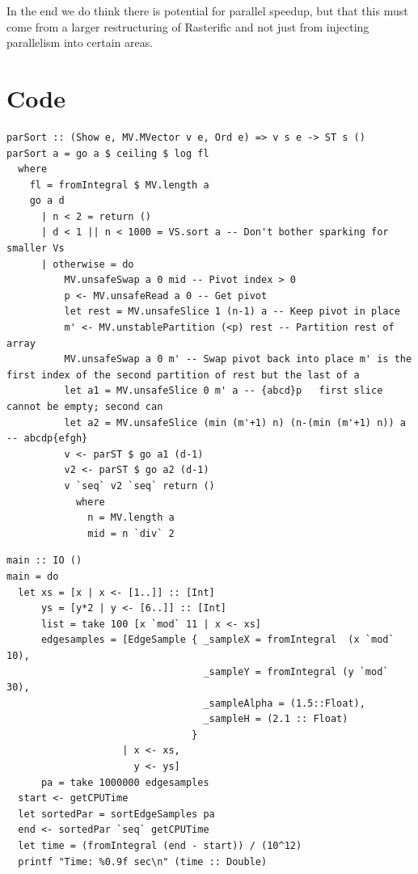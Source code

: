 \documentclass[12pt, a4paper]{article}
\begin{document}
In the end we do think there is potential for parallel speedup, but that this must come from a larger restructuring of Rasterific and not just from injecting parallelism
 into certain areas.

\clearpage
\appendix

\section{Code}
\begin{lstlisting}[label={lst:parsort}, caption={Parallel Sorting}]
parSort :: (Show e, MV.MVector v e, Ord e) => v s e -> ST s ()
parSort a = go a $ ceiling $ log fl
  where
    fl = fromIntegral $ MV.length a
    go a d
      | n < 2 = return ()
      | d < 1 || n < 1000 = VS.sort a -- Don't bother sparking for smaller Vs
      | otherwise = do
          MV.unsafeSwap a 0 mid -- Pivot index > 0
          p <- MV.unsafeRead a 0 -- Get pivot
          let rest = MV.unsafeSlice 1 (n-1) a -- Keep pivot in place
          m' <- MV.unstablePartition (<p) rest -- Partition rest of array
          MV.unsafeSwap a 0 m' -- Swap pivot back into place m' is the first index of the second partition of rest but the last of a
          let a1 = MV.unsafeSlice 0 m' a -- {abcd}p   first slice cannot be empty; second can
          let a2 = MV.unsafeSlice (min (m'+1) n) (n-(min (m'+1) n)) a -- abcdp{efgh}
          v <- parST $ go a1 (d-1)
          v2 <- parST $ go a2 (d-1)
          v `seq` v2 `seq` return ()
            where
              n = MV.length a
              mid = n `div` 2
\end{lstlisting}%


\begin{lstlisting}[label={lst:sorting}]
main :: IO ()
main = do
  let xs = [x | x <- [1..]] :: [Int]
      ys = [y*2 | y <- [6..]] :: [Int]
      list = take 100 [x `mod` 11 | x <- xs]
      edgesamples = [EdgeSample { _sampleX = fromIntegral  (x `mod` 10),
                                  _sampleY = fromIntegral (y `mod` 30),
                                  _sampleAlpha = (1.5::Float),
                                  _sampleH = (2.1 :: Float)
                                }
                    | x <- xs,
                      y <- ys]
      pa = take 1000000 edgesamples
  start <- getCPUTime
  let sortedPar = sortEdgeSamples pa
  end <- sortedPar `seq` getCPUTime
  let time = (fromIntegral (end - start)) / (10^12)
  printf "Time: %0.9f sec\n" (time :: Double)
\end{lstlisting}
\end{document}
